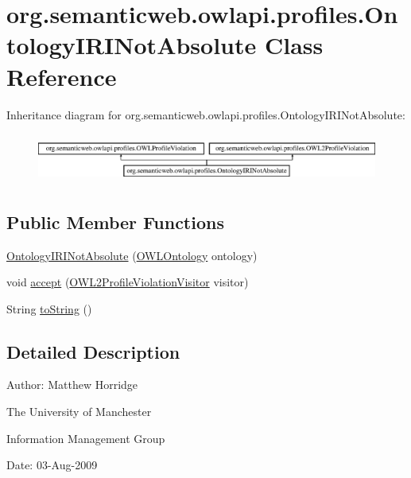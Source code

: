 \hypertarget{classorg_1_1semanticweb_1_1owlapi_1_1profiles_1_1_ontology_i_r_i_not_absolute}{\section{org.\-semanticweb.\-owlapi.\-profiles.\-Ontology\-I\-R\-I\-Not\-Absolute Class Reference}
\label{classorg_1_1semanticweb_1_1owlapi_1_1profiles_1_1_ontology_i_r_i_not_absolute}
}
Inheritance diagram for org.\-semanticweb.\-owlapi.\-profiles.\-Ontology\-I\-R\-I\-Not\-Absolute\-:\begin{figure}[H]
\begin{center}
\leavevmode
\includegraphics[height=1.656805cm]{classorg_1_1semanticweb_1_1owlapi_1_1profiles_1_1_ontology_i_r_i_not_absolute}
\end{center}
\end{figure}
\subsection*{Public Member Functions}
\begin{DoxyCompactItemize}
\item 
\hyperlink{classorg_1_1semanticweb_1_1owlapi_1_1profiles_1_1_ontology_i_r_i_not_absolute_a9025231b13162ff4f478ff48c2c18efe}{Ontology\-I\-R\-I\-Not\-Absolute} (\hyperlink{interfaceorg_1_1semanticweb_1_1owlapi_1_1model_1_1_o_w_l_ontology}{O\-W\-L\-Ontology} ontology)
\item 
void \hyperlink{classorg_1_1semanticweb_1_1owlapi_1_1profiles_1_1_ontology_i_r_i_not_absolute_af6830a79ba59e600f6646f1b4f21d599}{accept} (\hyperlink{interfaceorg_1_1semanticweb_1_1owlapi_1_1profiles_1_1_o_w_l2_profile_violation_visitor}{O\-W\-L2\-Profile\-Violation\-Visitor} visitor)
\item 
String \hyperlink{classorg_1_1semanticweb_1_1owlapi_1_1profiles_1_1_ontology_i_r_i_not_absolute_a4fba7fe4d1f68e3c1ea2f3779c5197e0}{to\-String} ()
\end{DoxyCompactItemize}


\subsection{Detailed Description}
Author\-: Matthew Horridge\par
 The University of Manchester\par
 Information Management Group\par
 Date\-: 03-\/\-Aug-\/2009 

